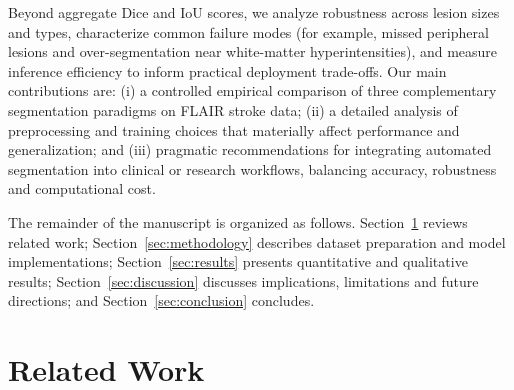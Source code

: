 \documentclass[12pt]{article}
\begin{document}
Beyond aggregate Dice and IoU scores, we analyze robustness across lesion sizes and types, characterize common failure modes (for example, missed peripheral lesions and over-segmentation near white-matter hyperintensities), and measure inference efficiency to inform practical deployment trade-offs. Our main contributions are: (i) a controlled empirical comparison of three complementary segmentation paradigms on FLAIR stroke data; (ii) a detailed analysis of preprocessing and training choices that materially affect performance and generalization; and (iii) pragmatic recommendations for integrating automated segmentation into clinical or research workflows, balancing accuracy, robustness and computational cost.

The remainder of the manuscript is organized as follows. Section~\ref{sec:relatedwork} reviews related work; Section~\ref{sec:methodology} describes dataset preparation and model implementations; Section~\ref{sec:results} presents quantitative and qualitative results; Section~\ref{sec:discussion} discusses implications, limitations and future directions; and Section~\ref{sec:conclusion} concludes.

\section{Related Work}\label{sec:relatedwork}
\end{document}
